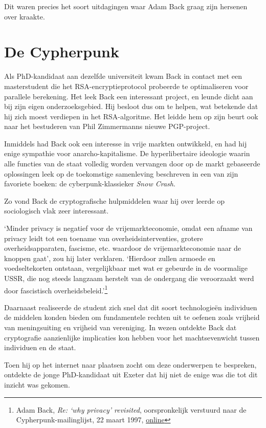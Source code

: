 \documentclass[
  a5paper,
  smalldemyvopaper,11pt,twoside,onecolumn,openright,extrafontsizes,
hidelinks]{memoir}
\begin{document}
Dit waren precies het soort uitdagingen waar Adam Back graag zijn
hersenen over kraakte.

\section{De Cypherpunk}\label{de-cypherpunk}

Als PhD-kandidaat aan dezelfde universiteit kwam Back in contact met een
masterstudent die het RSA-encryptieprotocol probeerde te optimaliseren
voor parallele berekening. Het leek Back een interessant project, en
leunde dicht aan bij zijn eigen onderzoeksgebied. Hij besloot dus om te
helpen, wat betekende dat hij zich moest verdiepen in het RSA-algoritme.
Het leidde hem op zijn beurt ook naar het bestuderen van Phil
Zimmermanns nieuwe PGP-project.

Inmiddels had Back ook een interesse in vrije markten ontwikkeld, en had
hij enige sympathie voor anarcho-kapitalisme. De hyperlibertaire
ideologie waarin alle functies van de staat volledig worden vervangen
door op de markt gebaseerde oplossingen leek op de toekomstige
samenleving beschreven in een van zijn favoriete boeken: de
cyberpunk-klassieker \emph{Snow Crash}.

Zo vond Back de cryptografische hulpmiddelen waar hij over leerde op
sociologisch vlak zeer interessant.

`Minder privacy is negatief voor de vrijemarkteconomie, omdat een afname
van privacy leidt tot een toename van overheidsinterventies, grotere
overheidsapparaten, fascisme, etc. waardoor de vrijemarkteconomie naar
de knoppen gaat', zou hij later verklaren. `Hierdoor zullen armoede en
voedseltekorten ontstaan, vergelijkbaar met wat er gebeurde in de
voormalige USSR, die nog steeds langzaam herstelt van de ondergang die
veroorzaakt werd door fascistisch overheidsbeleid.'\footnote{Adam Back,
  \emph{Re: `why privacy' revisited}, oorspronkelijk verstuurd naar de
  Cypherpunk-mailinglijst, 22 maart 1997,
  \href{https://cypherpunks.venona.com/date/1997/03/msg00586.html}{online}}

Daarnaast realiseerde de student zich snel dat dit soort technologieën
individuen de middelen konden bieden om fundamentele rechten uit te
oefenen zoals vrijheid van meningsuiting en vrijheid van vereniging. In
wezen ontdekte Back dat cryptografie aanzienlijke implicaties kon hebben
voor het machtsevenwicht tussen individuen en de staat.

Toen hij op het internet naar plaatsen zocht om deze onderwerpen te
bespreken, ontdekte de jonge PhD-kandidaat uit Exeter dat hij niet de
enige was die tot dit inzicht was gekomen.
\end{document}

